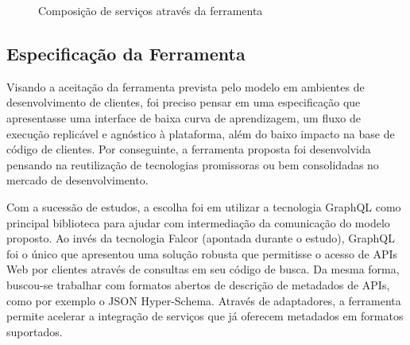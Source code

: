 \documentclass[12pt]{article}
\begin{document}
\begin{figure}[H]
  \centering
  \caption{Composição de serviços através da ferramenta}
\end{figure}

  \subsection{Especificação da Ferramenta}

  Visando a aceitação da ferramenta prevista pelo modelo em ambientes de desenvolvimento de clientes, foi preciso pensar em uma especificação que apresentasse uma interface de baixa curva de aprendizagem, um fluxo de execução replicável e agnóstico à plataforma, além do baixo impacto na base de código de clientes. Por conseguinte, a ferramenta proposta foi desenvolvida pensando na reutilização de tecnologias promissoras ou bem consolidadas no mercado de desenvolvimento.

Com a sucessão de estudos, a escolha foi em utilizar a tecnologia GraphQL como principal biblioteca para ajudar com intermediação da comunicação do modelo proposto. Ao invés da tecnologia Falcor (apontada durante o estudo), GraphQL foi o único que apresentou uma solução robusta que permitisse o acesso de APIs Web por clientes através de consultas em seu código de busca. Da mesma forma, buscou-se trabalhar com formatos abertos de descrição de metadados de APIs, como por exemplo o JSON Hyper-Schema. Através de adaptadores, a ferramenta permite acelerar a integração de serviços que já oferecem metadados em formatos suportados.
\end{document}
